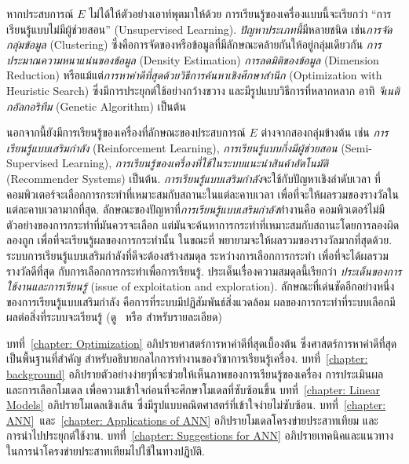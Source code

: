 หากประสบการณ์ $E$ ไม่ได้ให้ตัวอย่างเอาท์พุตมาให้ด้วย การเรียนรู้ของเครื่องแบบนี้จะเรียกว่า ``การเรียนรู้แบบไม่มีผู้ช่วยสอน'' (Unsupervised Learning).
\textit{ปัญหาประเภทนี้}มีหลายชนิด เช่น\textit{การจัดกลุ่มข้อมูล} (Clustering) ซึ่งคือการจัดของหรือข้อมูลที่มีลักษณะคล้ายกันให้อยู่กลุ่มเดียวกัน
\textit{การประมาณความหนาแน่นของข้อมูล} (Density Estimation)
\textit{การลดมิติของข้อมูล} (Dimension Reduction) 
หรือแม้แต่\textit{การหาค่าดีที่สุดด้วยวิธีการค้นหาเชิงศึกษาสำนึก} (Optimization with Heuristic Search) 
ซึ่งมีการประยุกต์ใช้อย่างกว้างขวาง และมีรูปแบบวิธีการที่หลากหลาก อาทิ \textit{จีเนติกอัลกอริทึม} (Genetic Algorithm) เป็นต้น

นอกจากนี้ยังมีการเรียนรู้ของเครื่องที่ลักษณะของประสบการณ์ $E$ ต่างจากสองกลุ่มข้างต้น เช่น \textit{การเรียนรู้แบบเสริมกำลัง} (Reinforcement Learning), 
\textit{การเรียนรู้แบบกึ่งมีผู้ช่วยสอน} (Semi-Supervised Learning), 
\textit{การเรียนรู้ของเครื่องที่ใช้ในระบบแนะนำสินค้าอัตโนมัติ} (Recommender Systems) เป็นต้น.
\textit{การเรียนรู้แบบเสริมกำลัง}จะใช้กับปัญหาเชิงลำดับเวลา ที่คอมพิวเตอร์จะเลือกการกระทำที่เหมาะสมกับสถานะในแต่ละคาบเวลา เพื่อที่จะให้ผลรวมของรางวัลในแต่ละคาบเวลามากที่สุด.
ลักษณะของปัญหาที่\textit{การเรียนรู้แบบเสริมกำลัง}ทำงานคือ คอมพิวเตอร์ไม่มีตัวอย่างของการกระทำที่มันควรจะเลือก แต่มันจะค้นหาการกระทำที่เหมาะสมกับสถานะโดยการลองผิดลองถูก เพื่อที่จะเรียนรู้ผลของการกระทำนั้น ในขณะที่ พยายามจะให้ผลรวมของรางวัลมากที่สุดด้วย.
ระบบการเรียนรู้แบบเสริมกำลังที่ดีจะต้องสร้างสมดุล ระหว่างการเลือกการกระทำ เพื่อที่จะได้ผลรวมรางวัลดีที่สุด กับการเลือกการกระทำเพื่อการเรียนรู้.
ประเด็นเรื่องความสมดุลนี้เรียกว่า \textit{ประเด็นของการใช้งานและการเรียนรู้} (issue of exploitation and exploration).
ลักษณะที่เด่นชัดอีกอย่างหนึ่งของการเรียนรู้แบบเสริมกำลัง คือการที่ระบบมีปฏิสัมพันธ์สิ่งแวดล้อม ผลของการกระทำที่ระบบเลือกมีผลต่อสิ่งที่ระบบจะเรียนรู้ (ดู~\cite{KatanyukulEtAl2011a} หรือ \cite{SuttonBarto1998a} สำหรับรายละเอียด)

บทที่~\ref{chapter: Optimization}
อภิปรายศาสตร์การหาค่าดีที่สุดเบื้องต้น 
ซึ่งศาสตร์การหาค่าดีที่สุดเป็นพื้นฐานที่สำคัญ 
สำหรับอธิบายกลไกการทำงานของวิชาการเรียนรู้เครื่อง.
%
บทที่~\ref{chapter: background} อภิปรายตัวอย่างง่ายๆที่จะช่วยให้เห็นภาพของการเรียนรู้ของเครื่อง การประเมินผล และการเลือกโมเดล เพื่อความเข้าใจก่อนที่จะศึกษาโมเดลที่ซับซ้อนขึ้น
%
บทที่~\ref{chapter: Linear Models} อภิปรายโมเดลเชิงเส้น ซึ่งมีรูปแบบคณิตศาสตร์ที่เข้าใจง่ายไม่ซับซ้อน.
บทที่~\ref{chapter: ANN}~และ~\ref{chapter: Applications of ANN} อภิปรายโมเดลโครงข่ายประสาทเทียม และการนำไปประยุกต์ใช้งาน.
บทที่~\ref{chapter: Suggestions for ANN} อภิปรายเทคนิคและแนวทางในการนำโครงข่ายประสาทเทียมไปใช้ในทางปฏิบัติ.


